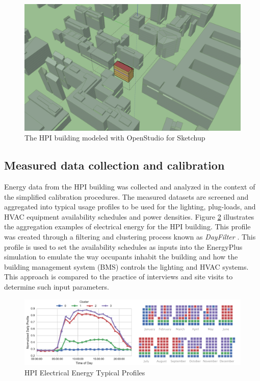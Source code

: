 \documentclass{tBPS2e}
\theoremstyle{plain}
\theoremstyle{definition}
\theoremstyle{remark}
\begin{document}
\begin{figure}[H]
\centering
\includegraphics[scale=0.2]{figures/HPI_Campus.png}
\caption{The HPI building modeled with OpenStudio for Sketchup}
\label{fig:HPIcampus}
\end{figure}


\subsection{Measured data collection and calibration}

Energy data from the HPI building was collected and analyzed in the context of the simplified calibration procedures. The measured datasets are screened and aggregated into typical usage profiles to be used for the lighting, plug-loads, and HVAC equipment availability schedules and power densities. Figure \ref{fig:hpi_elec_profiles} illustrates the aggregation examples of electrical energy for the HPI building. This profile was created through a filtering and clustering process known as \emph{DayFilter} \citep{Miller:2015kr}. This profile is used to set the availability schedules as inputs into the EnergyPlus simulation to emulate the way occupants inhabit the building and how the building management system (BMS) controls the lighting and HVAC systems. This approach is compared to the practice of interviews and site visits to determine such input parameters.

\begin{figure}[H]
\centering
\includegraphics[scale=0.55]{figures/HPI_combinedclusterandcal_5}
\caption{HPI Electrical Energy Typical Profiles}
\label{fig:hpi_elec_profiles}
\end{figure}
\end{document}
